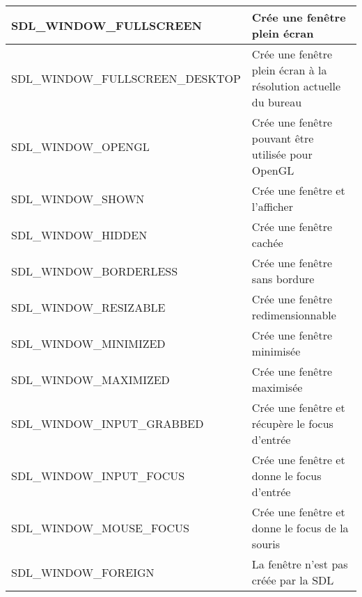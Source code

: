 \documentclass[a4paper,12pt,openany]{book}
\begin{document}
\begin{center}
\begin{tabular}{|l|l|}
	\hline
	 SDL_WINDOW_FULLSCREEN & Crée une fenêtre plein écran\\ \hline
	 SDL_WINDOW_FULLSCREEN_DESKTOP & Crée une fenêtre plein écran à la résolution actuelle du bureau\\ \hline
	 SDL_WINDOW_OPENGL & Crée une fenêtre pouvant être utilisée pour OpenGL\\ \hline
	\hline
	SDL_WINDOW_SHOWN & Crée une fenêtre et l'afficher \\ \hline
	SDL_WINDOW_HIDDEN & Crée une fenêtre cachée\\ \hline
	SDL_WINDOW_BORDERLESS & Crée une fenêtre sans bordure\\ \hline
	SDL_WINDOW_RESIZABLE & Crée une fenêtre redimensionnable\\ \hline
	SDL_WINDOW_MINIMIZED & Crée une fenêtre minimisée\\ \hline
	SDL_WINDOW_MAXIMIZED & Crée une fenêtre maximisée\\ \hline
	SDL_WINDOW_INPUT_GRABBED & Crée une fenêtre et récupère le focus d'entrée\\ \hline
	SDL_WINDOW_INPUT_FOCUS & Crée une fenêtre et donne le focus d'entrée\\ \hline
	SDL_WINDOW_MOUSE_FOCUS & Crée une fenêtre et donne le focus de la souris\\ \hline
	SDL_WINDOW_FOREIGN & La fenêtre n'est pas créée par la SDL\\ \hline
\end{tabular}
\end{center}
\end{document}
